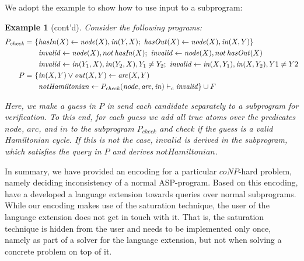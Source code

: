 \documentclass[11pt,fleqn,twoside]{article}
\def\naf{\ensuremath{\mathop{not}}}
\newtheorem{example}{Example}
\begin{document}
			We adopt the example to show how to use input to a subprogram:

			\begin{example}[cont'd]
				Consider the following programs:
				\begin{align}
					P_{\mathit{check}} = & \ \{ \mathit{hasIn}(X) \leftarrow \mathit{node}(X), \mathit{in}(Y,X); \ \mathit{hasOut}(X) \leftarrow \mathit{node}(X), \mathit{in}(X,Y) \} \label{ex:hamiltoniancycleqa:2} \\
										& \ \phantom{\{} \mathit{invalid} \leftarrow \mathit{node}(X), \naf \mathit{hasIn}(X); \ \mathit{invalid} \leftarrow \mathit{node}(X), \naf \mathit{hasOut}(X) \label{ex:hamiltoniancycleqa:5} \\
										& \ \phantom{\{} \mathit{invalid} \leftarrow \mathit{in}(Y_1,X), \mathit{in}(Y_2,X), Y_1 \not= Y_2; \ \mathit{invalid} \leftarrow \mathit{in}(X,Y_1), \mathit{in}(X,Y_2), Y1 \not= Y2 \label{ex:hamiltoniancycleqa:4} \\
					P = & \ \{ \mathit{in}(X,Y) \vee \mathit{out}(X,Y) \leftarrow \mathit{arc}(X,Y) \\
						& \ \phantom{\{} \mathit{notHamiltonian} \leftarrow \queryatom{c}{P_{\mathit{check}}}{\mathit{invalid}}{\mathit{node}, \mathit{arc}, \mathit{in}} \} \cup F
				\end{align}

				Here, we make a guess in $P$ in send each candidate separately to a subprogram for verification.
				To this end, for each guess we add all true atoms over the predicates
				$\mathit{node}$, $\mathit{arc}$, and $\mathit{in}$ to the subprogram $P_{\mathit{check}}$
				and check if the guess is a valid Hamiltonian cycle.
				If this is not the case, $\mathit{invalid}$ is derived in the subprogram, which satisfies the query in $P$
				and derives $\mathit{notHamiltonian}$.
			\end{example}

			In summary, we have provided an encoding for a particular $\mathit{coNP}$-hard problem, namely deciding inconsistency of a normal ASP-program.
			Based on this encoding, have a developed a language extension towards queries over normal subprograms.
			While our encoding makes use of the saturation technique, the user of the language extension does not get in touch with it.
			That is, the saturation technique is hidden from the user and needs to be implemented only once, namely as part of a solver for the language extension,
			but not when solving a concrete problem on top of it.
			
\end{document}
